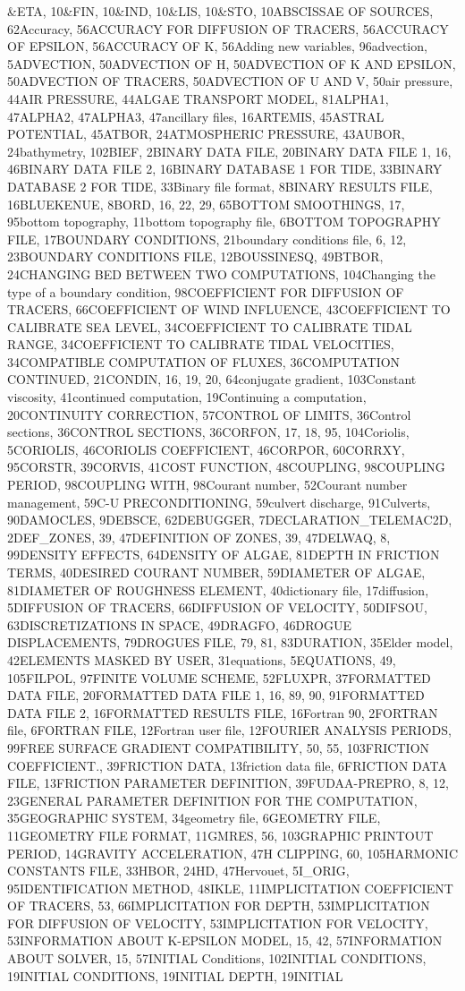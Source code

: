  \&ETA, 10\&FIN, 10\&IND, 10\&LIS, 10\&STO, 10ABSCISSAE OF SOURCES, 62Accuracy, 56ACCURACY FOR DIFFUSION OF TRACERS, 56ACCURACY OF EPSILON, 56ACCURACY OF K, 56Adding new variables, 96advection, 5ADVECTION, 50ADVECTION OF H, 50ADVECTION OF K AND EPSILON, 50ADVECTION OF TRACERS, 50ADVECTION OF U AND V, 50air pressure, 44AIR PRESSURE, 44ALGAE TRANSPORT MODEL, 81ALPHA1, 47ALPHA2, 47ALPHA3, 47ancillary files, 16ARTEMIS, 45ASTRAL POTENTIAL, 45ATBOR, 24ATMOSPHERIC PRESSURE, 43AUBOR, 24bathymetry, 102BIEF, 2BINARY DATA FILE, 20BINARY DATA FILE 1, 16, 46BINARY DATA FILE 2, 16BINARY DATABASE 1 FOR TIDE, 33BINARY DATABASE 2 FOR TIDE, 33Binary file format, 8BINARY RESULTS FILE, 16BLUEKENUE, 8BORD, 16, 22, 29, 65BOTTOM SMOOTHINGS, 17, 95bottom topography, 11bottom topography file, 6BOTTOM TOPOGRAPHY FILE, 17BOUNDARY CONDITIONS, 21boundary conditions file, 6, 12, 23BOUNDARY CONDITIONS FILE, 12BOUSSINESQ, 49BTBOR, 24CHANGING BED BETWEEN TWO COMPUTATIONS, 104Changing the type of a boundary condition, 98COEFFICIENT FOR DIFFUSION OF TRACERS, 66COEFFICIENT OF WIND INFLUENCE, 43COEFFICIENT TO CALIBRATE SEA LEVEL, 34COEFFICIENT TO CALIBRATE TIDAL RANGE, 34COEFFICIENT TO CALIBRATE TIDAL VELOCITIES, 34COMPATIBLE COMPUTATION OF FLUXES, 36COMPUTATION CONTINUED, 21CONDIN, 16, 19, 20, 64conjugate gradient, 103Constant viscosity, 41continued computation, 19Continuing a computation, 20CONTINUITY CORRECTION, 57CONTROL OF LIMITS, 36Control sections, 36CONTROL SECTIONS, 36CORFON, 17, 18, 95, 104Coriolis, 5CORIOLIS, 46CORIOLIS COEFFICIENT, 46CORPOR, 60CORRXY, 95CORSTR, 39CORVIS, 41COST FUNCTION, 48COUPLING, 98COUPLING PERIOD, 98COUPLING WITH, 98Courant number, 52Courant number management, 59C-U PRECONDITIONING, 59culvert discharge, 91Culverts, 90DAMOCLES, 9DEBSCE, 62DEBUGGER, 7DECLARATION\_TELEMAC2D, 2DEF\_ZONES, 39, 47DEFINITION OF ZONES, 39, 47DELWAQ, 8, 99DENSITY EFFECTS, 64DENSITY OF ALGAE, 81DEPTH IN FRICTION TERMS, 40DESIRED COURANT NUMBER, 59DIAMETER OF ALGAE, 81DIAMETER OF ROUGHNESS ELEMENT, 40dictionary file, 17diffusion, 5DIFFUSION OF TRACERS, 66DIFFUSION OF VELOCITY, 50DIFSOU, 63DISCRETIZATIONS IN SPACE, 49DRAGFO, 46DROGUE DISPLACEMENTS, 79DROGUES FILE, 79, 81, 83DURATION, 35Elder model, 42ELEMENTS MASKED BY USER, 31equations, 5EQUATIONS, 49, 105FILPOL, 97FINITE VOLUME SCHEME, 52FLUXPR, 37FORMATTED DATA FILE, 20FORMATTED DATA FILE 1, 16, 89, 90, 91FORMATTED DATA FILE 2, 16FORMATTED RESULTS FILE, 16Fortran 90, 2FORTRAN file, 6FORTRAN FILE, 12Fortran user file, 12FOURIER ANALYSIS  PERIODS, 99FREE SURFACE GRADIENT COMPATIBILITY, 50, 55, 103FRICTION COEFFICIENT., 39FRICTION DATA, 13friction data file, 6FRICTION DATA FILE, 13FRICTION PARAMETER DEFINITION, 39FUDAA-PREPRO, 8, 12, 23GENERAL PARAMETER DEFINITION FOR THE COMPUTATION, 35GEOGRAPHIC SYSTEM, 34geometry file, 6GEOMETRY FILE, 11GEOMETRY FILE FORMAT, 11GMRES, 56, 103GRAPHIC PRINTOUT PERIOD, 14GRAVITY ACCELERATION, 47H CLIPPING, 60, 105HARMONIC CONSTANTS FILE, 33HBOR, 24HD, 47Hervouet, 5I\_ORIG, 95IDENTIFICATION  METHOD, 48IKLE, 11IMPLICITATION COEFFICIENT OF TRACERS, 53, 66IMPLICITATION FOR DEPTH, 53IMPLICITATION FOR DIFFUSION OF VELOCITY, 53IMPLICITATION FOR VELOCITY, 53INFORMATION ABOUT K-EPSILON MODEL, 15, 42, 57INFORMATION ABOUT SOLVER, 15, 57INITIAL Conditions, 102INITIAL CONDITIONS, 19INITIAL CONDITIONS, 19INITIAL DEPTH, 19INITIAL 